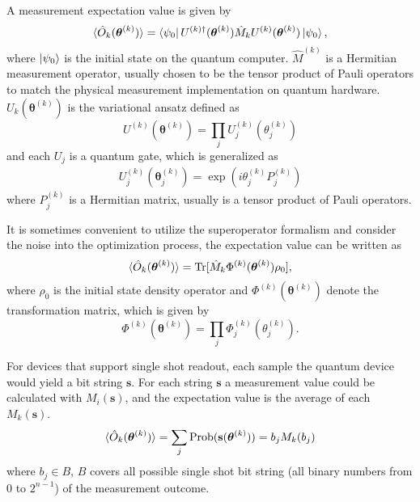 A measurement expectation value is given by
\begin{equation}
    \braket{\hat{O}_k(\boldsymbol{\theta}^{(k)})} = \bra{\psi_0}U^{(k)\dagger}(\boldsymbol{\theta}^{(k)}) \hat{M}_{k} U^{(k)}(\boldsymbol{\theta}^{(k)})\ket{\psi_0},
\end{equation}
where $\ket{\psi_0}$ is the initial state on the quantum computer. 
$\hat{M}^{(k)}$ is a Hermitian measurement operator, usually chosen to be the tensor product of Pauli operators to match the physical measurement implementation on quantum hardware.  $U_k(\boldsymbol{\theta}^{(k)})$ is the variational ansatz defined as
\begin{equation}
    U^{(k)}(\boldsymbol{\theta}^{(k)}) = \prod_j U^{(k)}_j(\theta^{(k)}_j)
\end{equation}
and each $U_j$ is a quantum gate, which is generalized as
\begin{align}
U^{(k)}_{j}(\boldsymbol{\theta}^{(k)}_j) = \exp(i \theta^{(k)}_{j} P^{(k)}_j)
\end{align}
where $P_j^{(k)}$ is a Hermitian matrix, usually is a tensor product of Pauli operators. 

It is sometimes convenient to utilize the superoperator formalism and consider the noise into the optimization process, the expectation value can be written as
\begin{equation}
    \braket{\hat{O}_k(\boldsymbol{\theta}^{(k)})} = \operatorname{Tr}[\hat{M}_k\Phi^{(k)}(\boldsymbol{\theta}^{(k)})\rho_0],
\end{equation}
where $\rho_0$ is the initial state density operator and $\Phi^{(k)}(\boldsymbol{\theta}^{(k)})$ denote the transformation matrix, which is given by 
\begin{equation}
    \Phi^{(k)}(\boldsymbol{\theta}^{(k)}) = \prod_j \Phi^{(k)}_j(\theta^{(k)}_j).
\end{equation}

For devices that support single shot readout, each sample the quantum device would yield a bit string $\mathbf{s}$. For each string $\mathbf{s}$ a measurement value could be calculated with $M_i(\mathbf{s})$, and the expectation value is the average of each $M_k(\mathbf{s})$.
\begin{equation}
    \braket{\hat{O}_k(\boldsymbol{\theta}^{(k)})} = \sum_j \mathrm{Prob(\mathbf{s}}(\boldsymbol{\theta}^{(k)}))=b_jM_k(b_j)
\end{equation}
where $b_j \in B$, $B$ covers all possible single shot bit string (all binary numbers from $0$ to $2^{n-1}$) of the measurement outcome.

